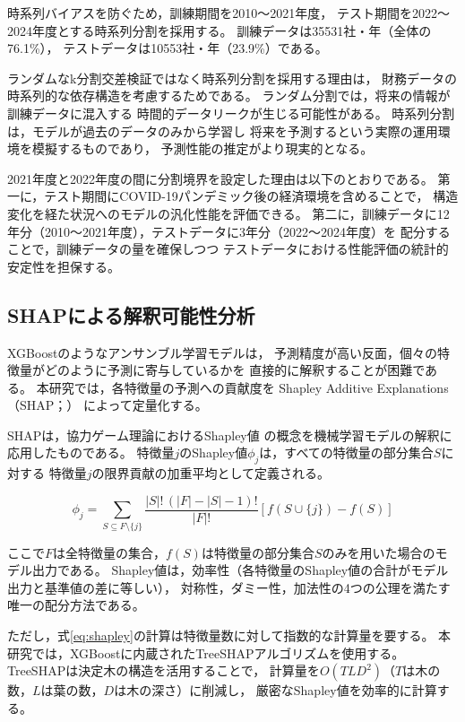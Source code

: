 時系列バイアスを防ぐため，訓練期間を2010〜2021年度，
テスト期間を2022〜2024年度とする時系列分割を採用する。
訓練データは\num{35531}社・年（全体の76.1\%），
テストデータは\num{10553}社・年（23.9\%）である。

ランダムなk分割交差検証ではなく時系列分割を採用する理由は，
財務データの時系列的な依存構造を考慮するためである。
ランダム分割では，将来の情報が訓練データに混入する
時間的データリークが生じる可能性がある。
時系列分割は，モデルが過去のデータのみから学習し
将来を予測するという実際の運用環境を模擬するものであり，
予測性能の推定がより現実的となる。

2021年度と2022年度の間に分割境界を設定した理由は以下のとおりである。
第一に，テスト期間にCOVID-19パンデミック後の経済環境を含めることで，
構造変化を経た状況へのモデルの汎化性能を評価できる。
第二に，訓練データに12年分（2010〜2021年度），テストデータに3年分（2022〜2024年度）を
配分することで，訓練データの量を確保しつつ
テストデータにおける性能評価の統計的安定性を担保する。

\subsection{SHAPによる解釈可能性分析}
\label{subsec:shap}

XGBoostのようなアンサンブル学習モデルは，
予測精度が高い反面，個々の特徴量がどのように予測に寄与しているかを
直接的に解釈することが困難である。
本研究では，各特徴量の予測への貢献度を
Shapley Additive Explanations（SHAP；）
によって定量化する。

SHAPは，協力ゲーム理論におけるShapley値
\citep{Shapley1953}の概念を機械学習モデルの解釈に応用したものである。
特徴量$j$のShapley値$\phi_j$は，すべての特徴量の部分集合$S$に対する
特徴量$j$の限界貢献の加重平均として定義される。

\begin{equation}
  \phi_j = \sum_{S \subseteq F \setminus \{j\}}
  \frac{|S|!\,(|F| - |S| - 1)!}{|F|!}
  \left[ f(S \cup \{j\}) - f(S) \right]
  \label{eq:shapley}
\end{equation}

ここで$F$は全特徴量の集合，$f(S)$は特徴量の部分集合$S$のみを用いた場合のモデル出力である。
Shapley値は，効率性（各特徴量のShapley値の合計がモデル出力と基準値の差に等しい），
対称性，ダミー性，加法性の4つの公理を満たす唯一の配分方法である。

ただし，式\eqref{eq:shapley}の計算は特徴量数に対して指数的な計算量を要する。
本研究では，XGBoostに内蔵されたTreeSHAPアルゴリズムを使用する。
TreeSHAPは決定木の構造を活用することで，
計算量を$O(TLD^2)$（$T$は木の数，$L$は葉の数，$D$は木の深さ）に削減し，
厳密なShapley値を効率的に計算する。

